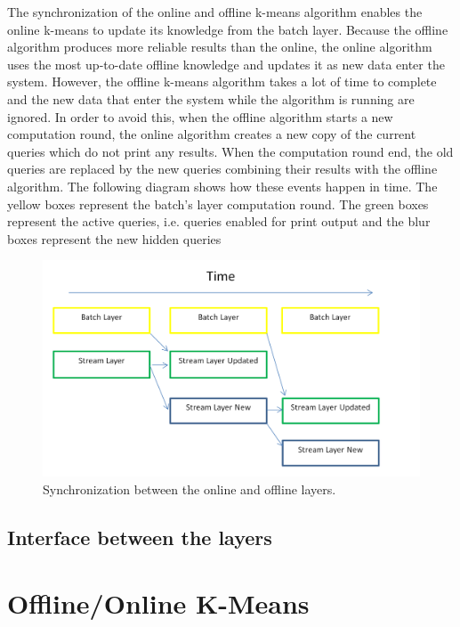 \documentclass{lmproj}
\begin{document}
The synchronization of the online and offline k-means algorithm enables the online k-means to update its knowledge from the batch layer. Because the offline algorithm produces more reliable results than the online, the online algorithm uses the most up-to-date offline knowledge and updates it as new data enter the system. However, the offline k-means algorithm takes a lot of time to complete and the new data that enter the system while the algorithm is running are ignored. In order to avoid this, when the offline algorithm starts a new computation round, the online algorithm creates a new copy of the current queries which do not print any results. When the computation round end, the old queries are replaced by the new queries combining their results with the offline algorithm. The following diagram shows how these events happen in time. The yellow boxes represent the batch’s layer computation round. The green boxes represent the active queries, i.e. queries enabled for print output and the blur boxes represent the new hidden queries 

\begin{figure}[H]
	\centering	
	\includegraphics[scale=0.4]{synchronization}
	\caption{Synchronization between the online and offline layers.}
\end{figure}

\section{Interface between the layers}
\label{systemdescr}




\chapter{Offline/Online K-Means}
\label{kmeans}
\end{document}
